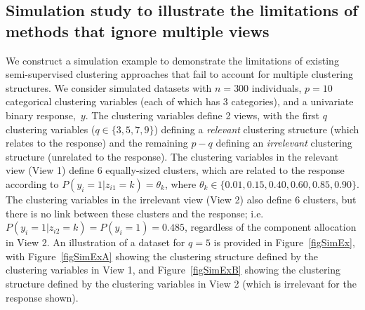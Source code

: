 \documentclass[12pt]{article}
\begin{document}
\subsection{Simulation study to illustrate the limitations of methods that ignore multiple views}\label{simstudy}
We construct a simulation example to demonstrate the limitations of existing semi-supervised clustering approaches that fail to account for multiple clustering structures.  We consider simulated datasets with $n = 300$ individuals, $p = 10$ categorical clustering variables (each of which has 3 categories), and a univariate binary response,~$y$.  The clustering variables define 2 views, with the first $q$ clustering variables ($q \in \{3, 5, 7, 9\} $) defining a {\em relevant} clustering structure  (which relates to the response) and the remaining $p-q$ defining an {\em irrelevant} clustering structure (unrelated to the response).  The clustering variables in the relevant view (View 1) define 6 equally-sized clusters, which are related to the response according to $P(y_i = 1 | z_{i1} = k) = \theta_k$, where $\theta_k \in \{0.01, 0.15, 0.40, 0.60, 0.85, 0.90\}$.  The clustering variables in the irrelevant view (View 2) also define 6 clusters, but there is no link between these clusters and the response; i.e. $P(y_i = 1 | z_{i2} = k) = P(y_i = 1 ) = 0.485$, regardless of the component allocation in View 2.  An illustration of a dataset for $q = 5$ is provided in Figure~\ref{figSimEx}, with Figure~\ref{figSimExA} showing the clustering structure defined by the clustering variables in View 1, and Figure~\ref{figSimExB} showing the clustering structure defined by the clustering variables in View 2 (which is irrelevant for the response shown).  
\end{document}
